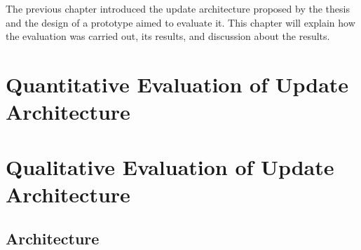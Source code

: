 \documentclass[0-thesis.tex]{subfiles}
\begin{document}
The previous chapter introduced the update architecture proposed by the thesis and the
design of a prototype aimed to evaluate it. This chapter will explain how the evaluation
was carried out, its results, and discussion about the results.

\section{Quantitative Evaluation of Update Architecture}
\label{sec:quant-evaluation}

\section{Qualitative Evaluation of Update Architecture}
\label{sec:qual-evaluation}

\subsection{Architecture}
\label{ssec:arch-evaluation}
\end{document}
